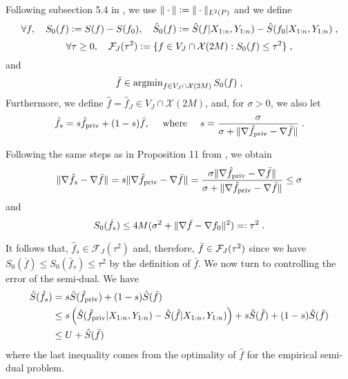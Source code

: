 \documentclass{article}
\theoremstyle{plain}
\theoremstyle{definition}
\theoremstyle{remark}
\newcommand{\argmin}[0]{\operatorname{argmin}}
\newcommand{\eqdef}{\vcentcolon=}
\newcommand{\defeq}{=\vcentcolon}
\newcommand\p[1]{\left( {#1}\right)}
\begin{document}
Following subsection 5.4 in \cite{hutter2021minimax}, we use $\| \cdot \| \eqdef \| \cdot \|_{L^2(P)}$ and we define 
\begin{equation}
    \forall f, \quad S_0(f) \eqdef S(f) - S(f_0), \quad \hat{S}_0(f) \eqdef \hat{S}(f | X_{1:n}, Y_{1:n}) - \hat{S}(f_0 | X_{1:n}, Y_{1:n}) \;,
\end{equation}
\begin{equation}
    \forall \tau \geq 0, \quad \mathcal{F}_J(\tau^2) \eqdef \{ f \in V_J \cap \mathcal{X}(2M): S_0(f) \leq \tau^2 \} \;,
\end{equation}
and 
\begin{equation}
    \Bar{f} \in \argmin_{f \in V_J \cap \mathcal{X}(2M)} S_0(f)   \;,
\end{equation}
Furthermore, we define $\hat{f} = \hat{f}_J \in V_J \cap \mathcal{X}(2M)$, and, for $\sigma > 0$, we also let
\begin{equation}
    \hat{f}_s = s \hat{f}_{\text{\normalshape priv}} + (1 - s) \Bar{f}, \quad \text{ where } \quad s = \frac{\sigma}{ \sigma + \| \nabla \hat{f}_{\text{\normalshape priv}} - \nabla \Bar{f} \|} \;.
\end{equation}

Following the same steps as in Proposition 11 from \cite{hutter2021minimax}, we obtain
\begin{equation}
    \| \nabla \hat{f}_s - \nabla \Bar{f} \| = s \| \nabla \hat{f}_{\text{\normalshape priv}} - \nabla \Bar{f} \| = \frac{\sigma \| \nabla \hat{f}_{\text{\normalshape priv}} - \nabla \Bar{f} \|}{\sigma + \| \nabla \hat{f}_{\text{\normalshape priv}} - \nabla \Bar{f} \|} \leq \sigma
\end{equation}
and
\begin{equation}
    S_0 (\hat{f}_s) \leq 4 M (\sigma^2 + \|  \nabla \Bar{f} - \nabla {f}_0 \|^2) \defeq \tau^2 \;.
\end{equation}

It follows that, $\hat{f}_s \in \mathcal{F}_J(\tau^2)$ and, therefore, $\Bar{f} \in \mathcal{F}_J(\tau^2)$ since we have $S_0(\bar f) \leq S_0(\bar f_s) \leq \tau^2$ by the definition of $\bar f$. 
We now turn to controlling the error of the semi-dual. 
We have
\begin{equation}
    \begin{aligned}
        \hat{S}(\hat{f}_s)
        &= s \hat{S}(\hat{f}_{\text{\normalshape priv}}) + (1-s) \hat{S}(\Bar{f}) \\
        & \leq  s \p{\hat{S}(\hat{f}_{\text{\normalshape priv}} | X_{1:n}, Y_{1:n}) - \hat{S}(\hat{f} | X_{1:n}, Y_{1:n})} + s \hat{S}(\hat{f}) + (1-s) \hat{S}(\Bar{f}) \\
        & \leq U + \hat{S}(\Bar{f}) \\
    \end{aligned}
\end{equation}
where the last inequality comes from the optimality of $\hat{f}$ for the empirical semi-dual problem.
\end{document}
